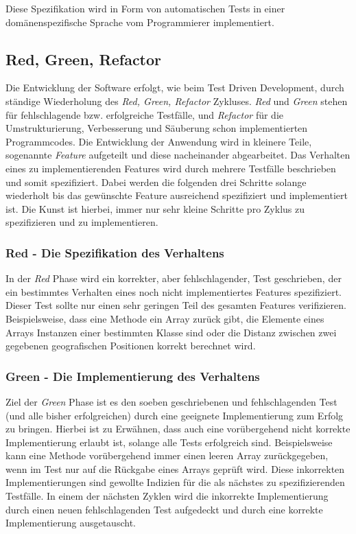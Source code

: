 Diese Spezifikation wird in Form von automatischen Tests in einer
domänen\-spezifische Sprache vom Programmierer implementiert.

\subsection{Red, Green, Refactor}

Die Entwicklung der Software erfolgt, wie beim Test Driven
Development, durch ständige Wiederholung des \textit{Red, Green,
  Refactor} Zykluses. \textit{Red} und \textit{Green} stehen für
fehlschlagende bzw. erfolgreiche Testfälle, und \textit{Refactor} für
die Umstrukturierung, Verbesserung und Säuberung schon implementierten
Programmcodes. Die Entwicklung der Anwendung wird in kleinere Teile,
sogenannte \textit{Feature} aufgeteilt und diese nacheinander
abgearbeitet. Das Verhalten eines zu implementierenden Features wird
durch mehrere Testfälle beschrieben und somit spezifiziert. Dabei
werden die folgenden drei Schritte solange wiederholt bis das
gewünschte Feature ausreichend spezifiziert und implementiert ist. Die
Kunst ist hierbei, immer nur sehr kleine Schritte pro Zyklus zu
spezifizieren und zu implementieren.

\subsubsection{Red - Die Spezifikation des Verhaltens}

In der \textit{Red} Phase wird ein korrekter, aber fehlschlagender,
Test geschrieben, der ein bestimmtes Verhalten eines noch nicht
implementiertes Features spezifiziert. Dieser Test sollte nur einen
sehr geringen Teil des gesamten Features
verifizieren. Beispielsweise, dass eine Methode ein Array zurück gibt,
die Elemente eines Arrays Instanzen einer bestimmten Klasse sind oder
die Distanz zwischen zwei gegebenen geografischen Positionen korrekt
berechnet wird.

\subsubsection{Green - Die Implementierung des Verhaltens}

Ziel der \textit{Green} Phase ist es den soeben geschriebenen und
fehlschlagenden Test (und alle bisher erfolgreichen) durch eine
geeignete Implementierung zum Erfolg zu bringen. Hierbei ist zu
Erwähnen, dass auch eine vorübergehend nicht korrekte Implementierung
erlaubt ist, solange alle Tests erfolgreich sind. Beispielsweise kann
eine Methode vorübergehend immer einen leeren Array zurückgegeben,
wenn im Test nur auf die Rückgabe eines Arrays geprüft wird. Diese
inkorrekten Implementierungen sind gewollte Indizien für die als
nächstes zu spezifizierenden Testfälle. In einem der nächsten Zyklen
wird die inkorrekte Implementierung durch einen neuen fehlschlagenden
Test aufgedeckt und durch eine korrekte Implementierung ausgetauscht.

